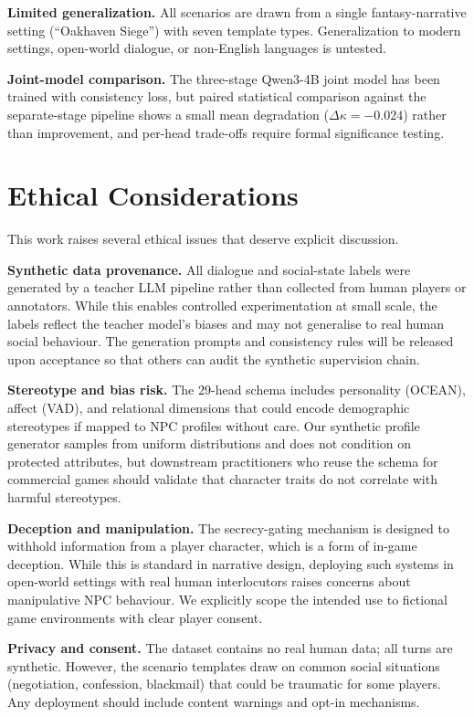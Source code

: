 \documentclass[11pt]{article}
\begin{document}
\textbf{Limited generalization.}
All scenarios are drawn from a single fantasy-narrative setting (``Oakhaven Siege'') with seven template types.
Generalization to modern settings, open-world dialogue, or non-English languages is untested.

\textbf{Joint-model comparison.}
The three-stage Qwen3-4B joint model has been trained with consistency loss, but paired statistical comparison against the separate-stage pipeline shows a small mean degradation ($\Delta\kappa{=}-0.024$) rather than improvement, and per-head trade-offs require formal significance testing.

\section*{Ethical Considerations}

This work raises several ethical issues that deserve explicit discussion.

\textbf{Synthetic data provenance.} All dialogue and social-state labels were generated by a teacher LLM pipeline rather than collected from human players or annotators.
While this enables controlled experimentation at small scale, the labels reflect the teacher model's biases and may not generalise to real human social behaviour.
The generation prompts and consistency rules will be released upon acceptance so that others can audit the synthetic supervision chain.

\textbf{Stereotype and bias risk.} The 29-head schema includes personality (OCEAN), affect (VAD), and relational dimensions that could encode demographic stereotypes if mapped to NPC profiles without care.
Our synthetic profile generator samples from uniform distributions and does not condition on protected attributes, but downstream practitioners who reuse the schema for commercial games should validate that character traits do not correlate with harmful stereotypes.

\textbf{Deception and manipulation.} The secrecy-gating mechanism is designed to withhold information from a player character, which is a form of in-game deception.
While this is standard in narrative design, deploying such systems in open-world settings with real human interlocutors raises concerns about manipulative NPC behaviour.
We explicitly scope the intended use to fictional game environments with clear player consent.

\textbf{Privacy and consent.} The dataset contains no real human data; all turns are synthetic.
However, the scenario templates draw on common social situations (negotiation, confession, blackmail) that could be traumatic for some players.
Any deployment should include content warnings and opt-in mechanisms.
\end{document}
